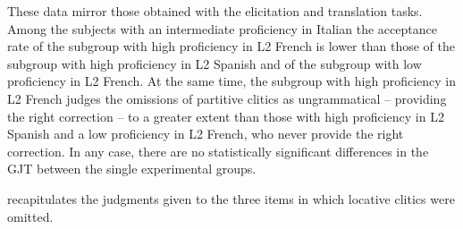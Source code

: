 \documentclass[output=paper,modfonts,nonflat,newtxmath]{langsci/langscibook}
\begin{document}
\begin{table}
\caption{\label{tab:sciutti:4} Judgments on items including an omission of a partitive clitic (ungrammatical)}
\end{table}
These data mirror those obtained with the elicitation and translation tasks. Among the subjects with an intermediate proficiency in Italian the acceptance rate of the subgroup with high proficiency in L2 French is lower than those of the subgroup with high proficiency in L2 Spanish and of the subgroup with low proficiency in L2 French. At the same time, the subgroup with high proficiency in L2 French  judges the omissions of partitive clitics as ungrammatical – providing the right correction – to a greater extent than those with high proficiency in L2 Spanish and a low proficiency in L2 French, who never provide the right correction. In any case, there are no statistically significant differences in the GJT between the single experimental groups.

 recapitulates the judgments given to the three items in which locative clitics were omitted.
\end{document}
